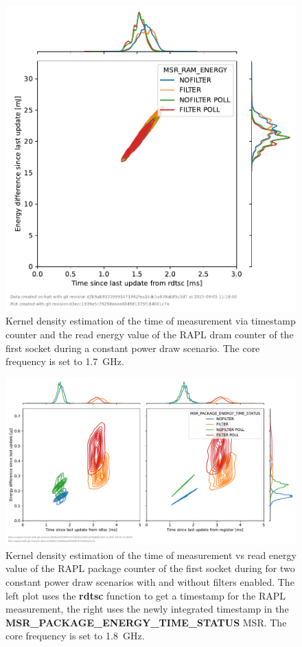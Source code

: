 \begin{figure}[]
    \centering
    \includegraphics[width=0.54\columnwidth]{fig/rapl-update-intervals/MSR_RAM_ENERGY_1700000.pdf}
    \caption{Kernel density estimation of the time of measurement via timestamp counter and the read energy value of the RAPL dram counter of the first socket during a constant power draw scenario.
    The core frequency is set to \SI{1.7}{\GHz}.}
\end{figure}

\clearpage
\begin{figure}[]
    \centering
    \includegraphics[width=\columnwidth]{fig/rapl-update-intervals/MSR_PACKAGE_ENERGY_TIME_STATUS_1800000.pdf}
    \caption{Kernel density estimation of the time of measurement vs read energy value of the RAPL package counter of the first socket during for two constant power draw scenarios with and without filters enabled.
    The left plot uses the \textbf{rdtsc} function to get a timestamp for the RAPL measurement, the right uses the newly integrated timestamp in the \textbf{MSR\_PACKAGE\_ENERGY\_TIME\_STATUS} MSR.
    The core frequency is set to \SI{1.8}{\GHz}.}
\end{figure}

